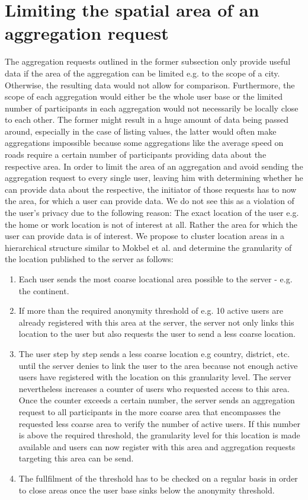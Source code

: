  \section{Limiting the spatial area of an aggregation request}
 The aggregation requests outlined in the former subsection only provide useful data if the area of the aggregation can be limited e.g. to the scope of a city. Otherwise, the resulting data would not allow for comparison. Furthermore, the scope of each aggregation would either be the whole user base or the limited number of participants in each aggregation would not necessarily be locally close to each other. The former might result in a huge amount of data being passed around, especially in the case of listing values, the latter would often make aggregations impossible because some aggregations like the average speed on roads require a certain number of participants providing data about the respective area. 
 In order to limit the area of an aggregation and avoid sending the aggregation request to every single user, leaving him with determining whether he can provide data about the respective, the initiator of those requests has to now the area, for which a user can provide data.
 We do not see this as a violation of the user's privacy due to the following reason: The exact location of the user e.g. the home or work location is not of interest at all. Rather the area for which the user can provide data is of interest. We propose to cluster location areas in a hierarchical structure similar to Mokbel et al. \parencite{casper} and determine the granularity of the location published to the server as follows:
\begin{enumerate}
	\item Each user sends the most coarse locational area possible to the server - e.g. the continent.
	\item If more than the required anonymity threshold of e.g. 10 active users are already registered with this area at the server, the server not only links this location to the user but also requests the user to send a less coarse location.
	\item The user step by step sends a less coarse location e.g country, district, etc. until the server denies to link the user to the area because not enough active users have registered with the location on this granularity level. The server nevertheless increases a counter of users who requested access to this area. Once the counter exceeds a certain number, the server sends an aggregation request to all participants in the more coarse area that encompasses the requested less coarse area to verify the number of active users. If this number is above the required threshold, the granularity level for this location is made available and users can now register with this area and aggregation requests targeting this area can be send.
	\item The fullfilment of the threshold has to be checked on a regular basis in order to close areas once the user base sinks below the anonymity threshold.
\end{enumerate}
